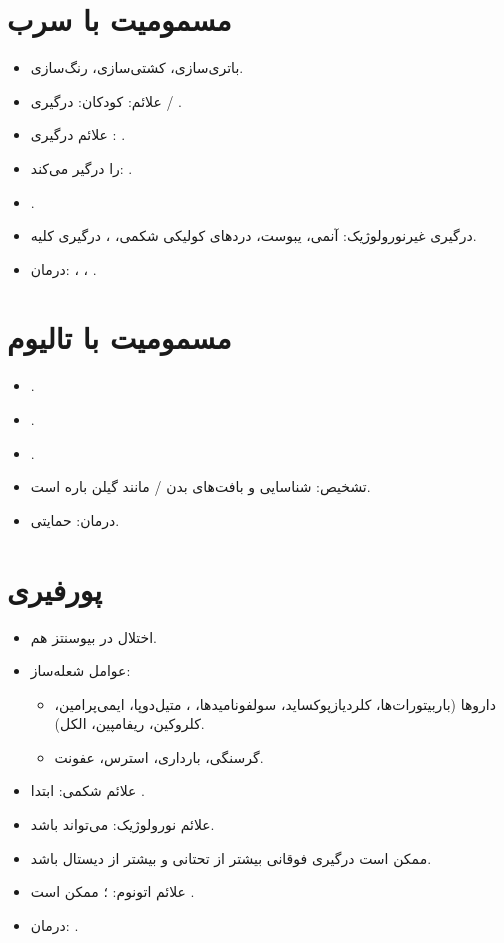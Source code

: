 \documentclass[a4paper,12pt]{extbook}
\begin{document}
\section*{مسمومیت با سرب}
\begin{itemize}
\item باتری‌سازی، کشتی‌سازی، رنگ‌سازی.
\item علائم: کودکان: درگیری  / .
\item علائم درگیری : .
\item {} را درگیر می‌کند: .
\item {}.
\item درگیری غیرنورولوژیک: آنمی، یبوست، دردهای کولیکی شکمی، ، درگیری کلیه.
\item درمان: ، ، .
\end{itemize}
\section*{مسمومیت با تالیوم}
\begin{itemize}
\item {}.
\item {}.
\item {}.
\item تشخیص: شناسایی  و بافت‌های بدن /  مانند گیلن باره است.
\item درمان: حمایتی.
\end{itemize}
\section*{پورفیری}
\begin{itemize}
\item اختلال در بیوسنتز هم.
\item عوامل شعله‌ساز:
\begin{itemize}
\item داروها (باربیتورات‌ها، کلردیازپوکساید، سولفونامیدها، ، متیل‌دوپا، ایمی‌پرامین، کلروکین، ریفامپین، الکل).
\item گرسنگی، بارداری، استرس، عفونت.
\end{itemize}
\item علائم شکمی: ابتدا .
\item علائم نورولوژیک:  می‌تواند  باشد.
\item ممکن است درگیری فوقانی بیشتر از تحتانی و  بیشتر از دیستال باشد.
\item علائم اتونوم: ؛ ممکن است .
\item درمان: .
\end{itemize}
\endgroup
\ifPNDStandalone
  \expandafter\enddocument
\fi
\end{document}
